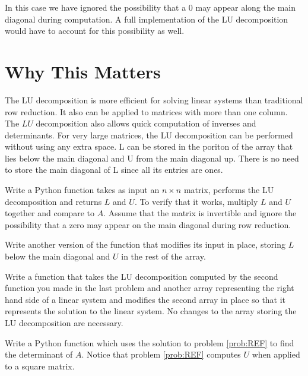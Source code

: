 In this case we have ignored the possibility that a 0 may appear along the main diagonal during computation.
A full implementation of the LU decomposition would have to account for this possibility as well.

\section*{Why This Matters}

The LU decomposition is more efficient for solving linear systems than traditional row reduction.
It also can be applied to matrices with more than one column.
The $LU$ decomposition also allows quick computation of inverses and determinants.
For very large matrices, the LU decomposition can be performed without using any extra space.
L can be stored in the poriton of the array that lies below the main diagonal and U from the main diagonal up.
There is no need to store the main diagonal of L since all its entries are ones.

\begin{problem}
\label{prob:LU}
Write a Python function takes as input an $n\times n$ matrix, performs the LU decomposition and returns $L$ and $U$.
To verify that it works, multiply $L$ and $U$ together and compare to $A$.
Assume that the matrix is invertible and ignore the possibility that a zero may appear on the main diagonal during row reduction.

Write another version of the function that modifies its input in place, storing $L$ below the main diagonal and $U$ in the rest of the array.
\end{problem}

\begin{problem}
Write a function that takes the LU decomposition computed by the second function you made in the last problem and another array representing the right hand side of a linear system and modifies the second array in place so that it represents the solution to the linear system.
No changes to the array storing the LU decomposition are necessary.
\end{problem}

\begin{problem}
\label{prob:det}
Write a Python function which uses the solution to problem \ref{prob:REF} to find the determinant of $A$.
Notice that problem \ref{prob:REF} computes $U$ when applied to a square matrix.
\end{problem}
